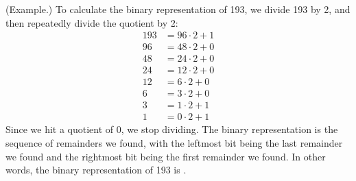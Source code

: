 \documentclass[letterpaper]{article}
\begin{document}
\begin{mdframed}
    (Example.) To calculate the binary representation of 193, we divide 193 by 2, and then repeatedly divide the quotient by 2: 
    \begin{equation*}
        \begin{aligned}
            193 &= 96 \cdot 2 + 1 \\ 
            96 &= 48 \cdot 2 + 0 \\ 
            48 &= 24 \cdot 2 + 0 \\ 
            24 &= 12 \cdot 2 + 0 \\ 
            12 &= 6 \cdot 2 + 0 \\ 
            6 &= 3 \cdot 2 + 0 \\ 
            3 &= 1 \cdot 2 + 1 \\ 
            1 &= 0 \cdot 2 + 1
        \end{aligned}
    \end{equation*}
    Since we hit a quotient of 0, we stop dividing. The binary representation is the sequence of remainders we found, with the leftmost bit being the last remainder we found and the rightmost bit being the first remainder we found. In other words, the binary representation of 193 is .
\end{mdframed}
\end{document}
